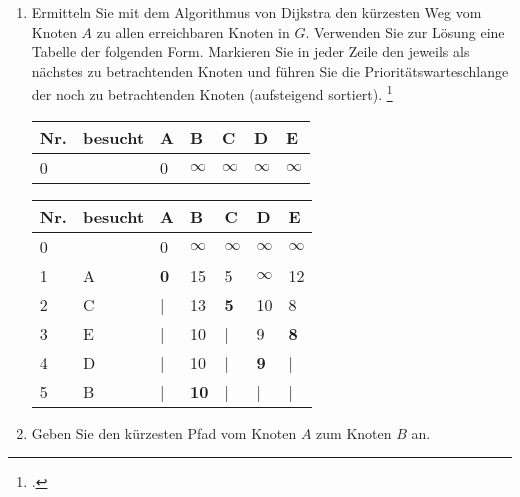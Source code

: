 \documentclass{bschlangaul-aufgabe}
\begin{document}
\begin{enumerate}


\item Ermitteln Sie mit dem Algorithmus von Dijkstra den kürzesten Weg
vom Knoten $A$ zu allen erreichbaren Knoten in $G$. Verwenden Sie zur
Lösung eine Tabelle der folgenden Form. Markieren Sie in jeder Zeile den
jeweils als nächstes zu betrachtenden Knoten und führen Sie die
Prioritätswarteschlange der noch zu betrachtenden Knoten (aufsteigend
sortiert).
\footcite{examen:66115:2020:09}

\begin{tabular}{lllllll}
\bf{Nr.}     & \bf{besucht} & \bf{A}       & \bf{B}       & \bf{C}       & \bf{D}       & \bf{E}       \\
\hline
0            &              & 0            & $\infty$     & $\infty$     & $\infty$     & $\infty$     \\
\end{tabular}

\begin{bAntwort}
\begin{tabular}{lllllll}
\bf{Nr.}     & \bf{besucht} & \bf{A}       & \bf{B}       & \bf{C}       & \bf{D}       & \bf{E}       \\
\hline
0            &              & 0            & $\infty$     & $\infty$     & $\infty$     & $\infty$     \\
1            & A            & \bf{0}       & 15           & 5            & $\infty$     & 12           \\
2            & C            & |            & 13           & \bf{5}       & 10           & 8            \\
3            & E            & |            & 10           & |            & 9            & \bf{8}       \\
4            & D            & |            & 10           & |            & \bf{9}       & |            \\
5            & B            & |            & \bf{10}      & |            & |            & |            \\
\end{tabular}
\end{bAntwort}


\item Geben Sie den kürzesten Pfad vom Knoten $A$ zum Knoten $B$ an.


\end{enumerate}
\end{document}
